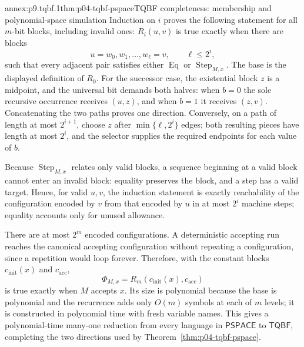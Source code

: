 \begin{annexitem}{annex:p9.tqbf.1}{thm:p04-tqbf-pspace}{TQBF completeness: membership and polynomial-space simulation}
Induction on \(i\) proves the following statement for all \(m\)-bit blocks,
including invalid ones: \(R_i(u,v)\) is true exactly when there are blocks
\[
 u=w_0,w_1,\ldots,w_\ell=v,
 \qquad \ell\leq2^i,
\]
such that every adjacent pair satisfies either \(\operatorname{Eq}\) or
\(\operatorname{Step}_{M,x}\).  The base is the displayed definition of
\(R_0\).  For the successor case, the existential block \(z\) is a midpoint,
and the universal bit demands both halves: when \(b=0\) the sole recursive
occurrence receives \((u,z)\), and when \(b=1\) it receives \((z,v)\).
Concatenating the two paths proves one direction.  Conversely, on a path of
length at most \(2^{i+1}\), choose \(z\) after
\(\min\{\ell,2^i\}\) edges; both resulting pieces have length at most
\(2^i\), and the selector supplies the required endpoints for each value of
\(b\).

Because \(\operatorname{Step}_{M,x}\) relates only valid blocks, a sequence
beginning at a valid block cannot enter an invalid block: equality preserves
the block, and a step has a valid target.  Hence, for valid \(u,v\), the
induction statement is exactly reachability of the configuration encoded by
\(v\) from that encoded by \(u\) in at most \(2^i\) machine steps; equality
accounts only for unused allowance.

There are at most \(2^m\) encoded configurations.  A deterministic accepting
run reaches the canonical accepting configuration without repeating a
configuration, since a repetition would loop forever.  Therefore, with the
constant blocks \(c_{\mathrm{init}}(x)\) and \(c_{\mathrm{acc}}\),
\[
 \Phi_{M,x}=R_m(c_{\mathrm{init}}(x),c_{\mathrm{acc}})
\]
is true exactly when \(M\) accepts \(x\).  Its size is polynomial because the
base is polynomial and the recurrence adds only \(O(m)\) symbols at each of
\(m\) levels; it is constructed in polynomial time with fresh variable names.
This gives a polynomial-time many-one reduction from every language in
\(\mathsf{PSPACE}\) to \(\mathsf{TQBF}\), completing the two directions used
by Theorem~\ref{thm:p04-tqbf-pspace}.
\end{annexitem}
